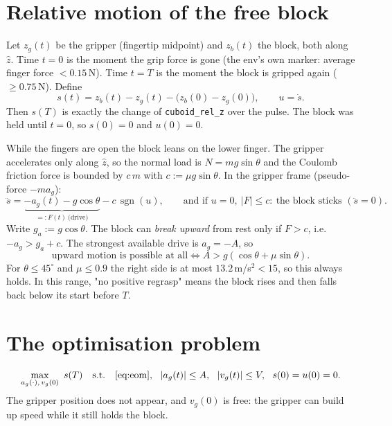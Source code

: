 \documentclass[11pt,a4paper]{article}
\newcommand{\sgn}{\operatorname{sgn}}
\newcommand{\code}[1]{\texttt{#1}}
\begin{document}
\section{Relative motion of the free block}
Let $z_g(t)$ be the gripper (fingertip midpoint) and $z_b(t)$ the block, both along $\hat z$. Time $t=0$ is the
moment the grip force is gone (the env's own marker: average finger force $<0.15$\,N). Time $t=T$ is the moment the
block is gripped again ($\ge0.75$\,N). Define
\[
  s(t) = z_b(t)-z_g(t) - \big(z_b(0)-z_g(0)\big), \qquad u=\dot s .
\]
Then $s(T)$ is exactly the change of \code{cuboid\_rel\_z} over the pulse. The block was held until $t=0$, so
$s(0)=0$ and $u(0)=0$.

While the fingers are open the block leans on the lower finger. The gripper accelerates only along $\hat z$, so the
normal load is $N=mg\sin\theta$ and the Coulomb friction force is bounded by $c\,m$ with $c:=\mu g\sin\theta$.
In the gripper frame (pseudo-force $-m a_g$):
\begin{equation}
  \ddot s = \underbrace{-a_g(t) - g\cos\theta}_{=:F(t)\ \text{(drive)}} - c\,\sgn(u),
  \qquad
  \text{and if } u=0,\ |F|\le c: \ \text{the block sticks } (\ddot s=0).
  \label{eq:eom}
\end{equation}
Write $g_a:=g\cos\theta$. The block can \emph{break upward} from rest only if $F>c$, i.e.\ $-a_g>g_a+c$.
The strongest available drive is $a_g=-A$, so
\begin{equation}
  \boxed{\text{upward motion is possible at all}\iff A > g(\cos\theta+\mu\sin\theta).}
  \label{eq:feas}
\end{equation}
For $\theta\le45^\circ$ and $\mu\le0.9$ the right side is at most $13.2$\,m/s$^2<15$, so this always holds.
In this range, "no positive regrasp" means the block rises and then falls back below its start before $T$.



\section{The optimisation problem}
\begin{equation}
  \max_{a_g(\cdot),\,v_g(0)}\ s(T)\quad\text{s.t.}\quad \eqref{eq:eom},\ \ |a_g(t)|\le A,\ \ |v_g(t)|\le V,\ \ s(0)=u(0)=0 .
  \label{eq:ocp}
\end{equation}
The gripper position does not appear, and $v_g(0)$ is free: the gripper can build up speed while it still holds the block.
\end{document}
